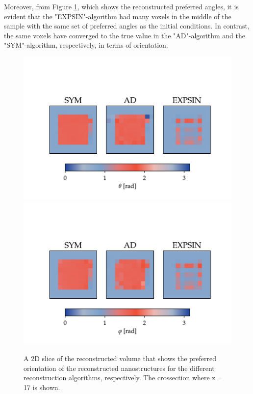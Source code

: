 \clearpage

Moreover, from Figure \ref{fig:phantom_reconstruction_2D_angles}, which shows the reconstructed preferred angles,
it is evident that the "EXPSIN"-algorithm had many voxels in the middle of the sample with the same set of preferred angles as the initial conditions.
In contrast, the same voxels have converged to the true value in the "AD"-algorithm and the "SYM"-algorithm, respectively,
in terms of orientation.


\begin{figure}[h!]
    \centering
    \includegraphics[trim = {0 0 0 2.5cm}, clip, width = 1\textwidth]{./svg-inkscape/P_slices_theta_svg-tex.pdf}
    \includegraphics[trim = {0 0 0 2.5cm}, clip, width = 1\textwidth]{./svg-inkscape/P_slices_phi_svg-tex.pdf}
    \caption{ A 2D slice of the reconstructed volume that shows the preferred orientation of the reconstructed nanostructures for the different reconstruction algorithms, respectively.
        The crossection where z = 17 is shown.}
    \label{fig:phantom_reconstruction_2D_angles}
\end{figure}




